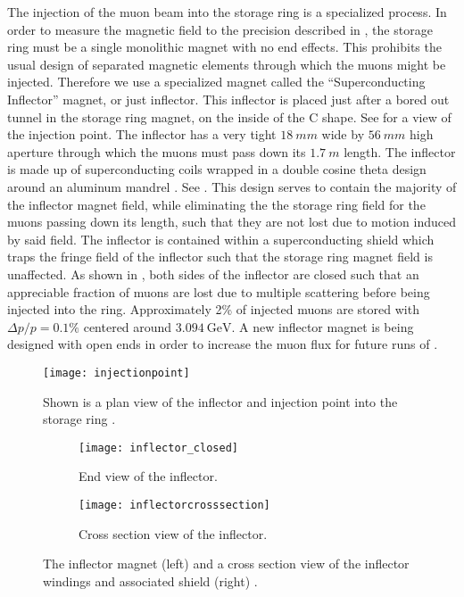 The injection of the muon beam into the \gmtwo storage ring is a specialized process. In order to measure the magnetic field to the precision described in , the \gmtwo storage ring must be a single monolithic magnet with no end effects. This prohibits the usual design of separated magnetic elements through which the muons might be injected. Therefore we use a specialized magnet called the ``Superconducting Inflector'' magnet, or just inflector. This inflector is placed just after a bored out tunnel in the storage ring magnet, on the inside of the C shape. See  for a view of the injection point. The inflector has a very tight $\SI{18}{mm}$ wide by $\SI{56}{mm}$ high aperture through which the muons must pass down its $\SI{1.7}{m}$ length. The inflector is made up of superconducting coils wrapped in a double cosine theta design around an aluminum mandrel \cite{inflector}. See . This design serves to contain the majority of the inflector magnet field, while eliminating the the storage ring field for the muons passing down its length, such that they are not lost due to motion induced by said field. The inflector is contained within a superconducting shield which traps the fringe field of the inflector such that the storage ring magnet field is unaffected. As shown in , both sides of the inflector are closed such that an appreciable fraction of muons are lost due to multiple scattering before being injected into the ring. Approximately 2\% of injected muons are stored with $\Delta p / p = 0.1\%$ centered around $\SI{3.094}{\GeV}$. A new inflector magnet is being designed with open ends in order to increase the muon flux for future runs of \gmtwo \cite{TDR}.


\begin{figure}[]
    \centering
    \texttt{[image: injectionpoint]}
    \caption[Muon injection point through inflector]{Shown is a plan view of the inflector and injection point into the storage ring \cite{inflector}.}   
    \label{fig:injectionpoint}
\end{figure}

\begin{figure}[]
\centering
    \begin{subfigure}[t]{0.45\textwidth}
        \centering
        \texttt{[image: inflector\_closed]}
        \caption{End view of the inflector.}
    \end{subfigure}%
    \hspace{1cm}
    \begin{subfigure}[t]{0.45\textwidth}
        \centering
        \texttt{[image: inflectorcrosssection]}
        \caption{Cross section view of the inflector.}
    \end{subfigure}
\caption[Superconducting inflector magnet]{The inflector magnet (left) and a cross section view of the inflector windings and associated shield (right) \cite{inflector}.}
\label{fig:inflector}
\end{figure}



